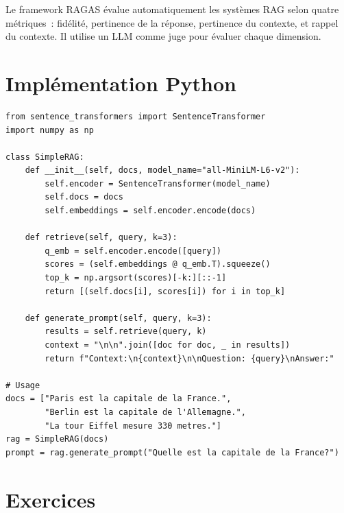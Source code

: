 \begin{exemple}[RAGAS]
Le framework RAGAS \'evalue automatiquement les syst\`emes RAG selon
quatre m\'etriques~: fid\'elit\'e, pertinence de la r\'eponse,
pertinence du contexte, et rappel du contexte. Il utilise un LLM comme
juge pour \'evaluer chaque dimension.
\end{exemple}

\section{Impl\'ementation Python}
\label{sec:rag:code}

\begin{codeblock}[title=\textbf{Pipeline RAG minimaliste}]
\begin{verbatim}
from sentence_transformers import SentenceTransformer
import numpy as np

class SimpleRAG:
    def __init__(self, docs, model_name="all-MiniLM-L6-v2"):
        self.encoder = SentenceTransformer(model_name)
        self.docs = docs
        self.embeddings = self.encoder.encode(docs)

    def retrieve(self, query, k=3):
        q_emb = self.encoder.encode([query])
        scores = (self.embeddings @ q_emb.T).squeeze()
        top_k = np.argsort(scores)[-k:][::-1]
        return [(self.docs[i], scores[i]) for i in top_k]

    def generate_prompt(self, query, k=3):
        results = self.retrieve(query, k)
        context = "\n\n".join([doc for doc, _ in results])
        return f"Context:\n{context}\n\nQuestion: {query}\nAnswer:"

# Usage
docs = ["Paris est la capitale de la France.",
        "Berlin est la capitale de l'Allemagne.",
        "La tour Eiffel mesure 330 metres."]
rag = SimpleRAG(docs)
prompt = rag.generate_prompt("Quelle est la capitale de la France?")
\end{verbatim}
\end{codeblock}

\section{Exercices}
\label{sec:rag:exercices}


